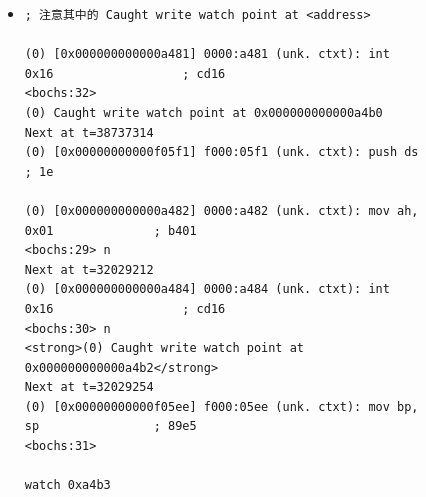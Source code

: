 \documentclass[a4paper]{article}
\begin{document}
\begin{appendices}
    \begin{figure}
    \begin{itemize}
    \item[] \begin{lstlisting}[label=lst:errorlog, caption=DEBUG过程中捕捉到的错误信息。栈溢出意外修改到代码段内存]
; 注意其中的 Caught write watch point at <address>
    
(0) [0x000000000000a481] 0000:a481 (unk. ctxt): int 0x16                  ; cd16
<bochs:32>
(0) Caught write watch point at 0x000000000000a4b0
Next at t=38737314
(0) [0x00000000000f05f1] f000:05f1 (unk. ctxt): push ds                   ; 1e

(0) [0x000000000000a482] 0000:a482 (unk. ctxt): mov ah, 0x01              ; b401
<bochs:29> n
Next at t=32029212
(0) [0x000000000000a484] 0000:a484 (unk. ctxt): int 0x16                  ; cd16
<bochs:30> n
<strong>(0) Caught write watch point at 0x000000000000a4b2</strong>
Next at t=32029254
(0) [0x00000000000f05ee] f000:05ee (unk. ctxt): mov bp, sp                ; 89e5
<bochs:31>

watch 0xa4b3
    \end{lstlisting}
    \end{itemize}
    \end{figure}
\end{appendices}
\end{document}
